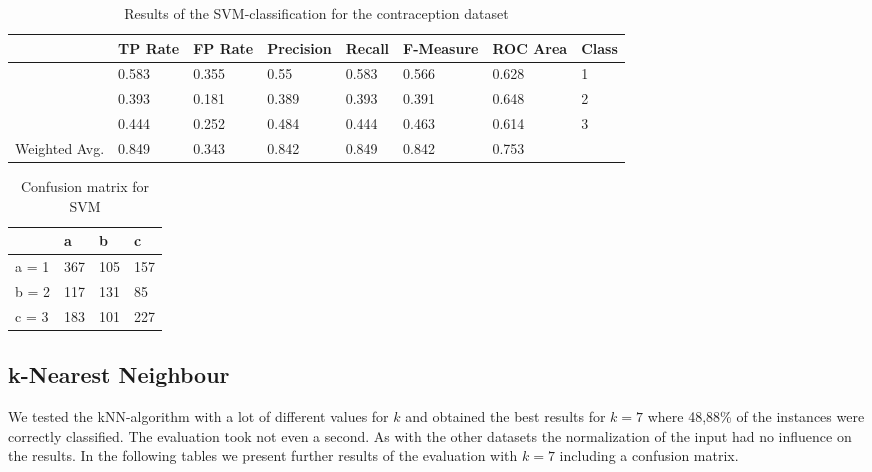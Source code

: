 \documentclass[paper=a4, fontsize=11pt]{scrartcl} %
\numberwithin{equation}{section} %
\numberwithin{figure}{section} %
\numberwithin{table}{section} %
\begin{document}
\begin{table}[h]
\centering
\begin{tabular}{|llllllll|}
	\hline
	&								TP Rate   	&FP Rate   &Precision   &Recall  &F-Measure   &ROC Area  	&Class\\
	\hline
									&0.583     	&0.355     &0.55      	&0.583   &0.566   		&0.628    	&1\\
                 	&0.393     	&0.181     &0.389     	&0.393   &0.391      	&0.648    	&2\\
                 	&0.444     	&0.252     &0.484     	&0.444   &0.463      	&0.614    	&3\\
  \hline
	Weighted Avg.   & 0.849    & 0.343      &0.842   &  0.849     &0.842     & 0.753			&\\
	\hline
\end{tabular}
\caption{Results of the SVM-classification for the contraception dataset}
\end{table}

\vspace{6pt}

\begin{table}[h]
\centering
\begin{tabular}{|l|lll|}
	\hline
	      &a   &b   &c \\
	\hline
	a = 1 &367 &105 &157 \\
 	b = 2 &117 &131 &85 \\
 	c = 3 &183 &101 &227 \\
  \hline
\end{tabular}
\caption{Confusion matrix for SVM}
\end{table}

\subsection{k-Nearest Neighbour}

We tested the kNN-algorithm with a lot of different values for $k$ and obtained the best results for $k=7$ where 48,88\% of the instances were correctly classified. The evaluation took not even a second. As with the other datasets the normalization of the input had no influence on the results. In the following tables we present further results of the evaluation with $k=7$ including a confusion matrix.
\end{document}
